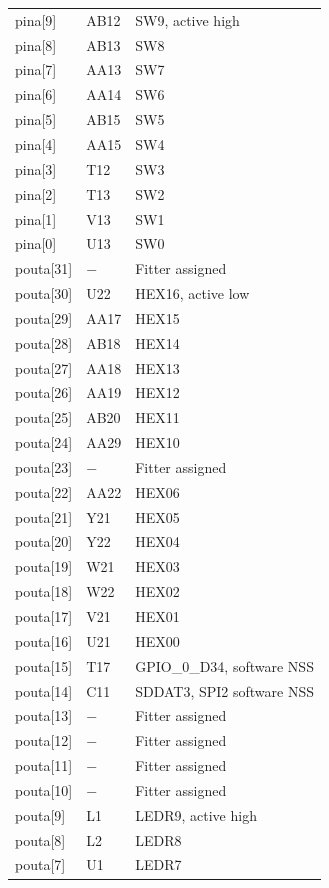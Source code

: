 \documentclass[12pt]{article}
\begin{document}
\begin{longtable}{lll}
pina[9]   & AB12     & SW9, active high \\
pina[8]   & AB13     & SW8 \\
pina[7]   & AA13     & SW7 \\
pina[6]   & AA14     & SW6 \\
pina[5]   & AB15     & SW5 \\
pina[4]   & AA15     & SW4 \\
pina[3]   & T12      & SW3 \\
pina[2]   & T13      & SW2 \\
pina[1]   & V13      & SW1 \\
pina[0]   & U13      & SW0 \\
pouta[31] & $-$      & Fitter assigned \\
pouta[30] & U22      & HEX16, active low \\
pouta[29] & AA17     & HEX15 \\
pouta[28] & AB18     & HEX14 \\
pouta[27] & AA18     & HEX13 \\
pouta[26] & AA19     & HEX12 \\
pouta[25] & AB20     & HEX11 \\
pouta[24] & AA29     & HEX10 \\
pouta[23] & $-$      & Fitter assigned \\
pouta[22] & AA22     & HEX06 \\
pouta[21] & Y21      & HEX05 \\
pouta[20] & Y22      & HEX04 \\
pouta[19] & W21      & HEX03 \\
pouta[18] & W22      & HEX02 \\
pouta[17] & V21      & HEX01 \\
pouta[16] & U21      & HEX00 \\
pouta[15] & T17      & GPIO\_0\_D34, software NSS \\
pouta[14] & C11      & SDDAT3, SPI2 software NSS \\
pouta[13] & $-$      & Fitter assigned \\
pouta[12] & $-$      & Fitter assigned \\
pouta[11] & $-$      & Fitter assigned \\
pouta[10] & $-$      & Fitter assigned \\
pouta[9]  & L1       & LEDR9, active high \\
pouta[8]  & L2       & LEDR8 \\
pouta[7]  & U1       & LEDR7 \\

\end{longtable}
\end{document}
